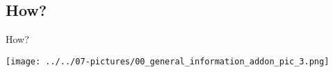 \documentclass[11pt]{beamer}
\begin{document}
\subsection{How? \\ \scalebox{0.8}{the learning tools we are going to use}}
\begin{frame}{How?}
	\begin{center}
	\texttt{[image: ../../07-pictures/00\_general\_information\_addon\_pic\_3.png]}
	\end{center}
\end{frame}
\end{document}
